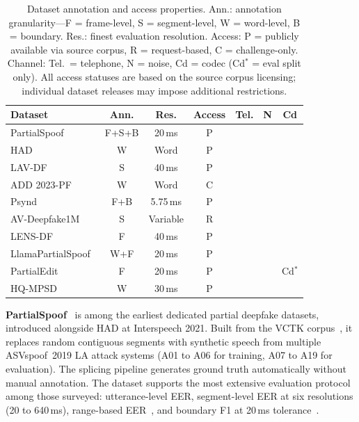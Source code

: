 \documentclass[journal]{IEEEtran}
\newcommand{\xmark}{\ding{55}}
\begin{document}
\begin{table}[t]
\centering
\caption{Dataset annotation and access properties. Ann.: annotation granularity---F = frame-level, S = segment-level, W = word-level, B = boundary. Res.: finest evaluation resolution. Access: P = publicly available via source corpus, R = request-based, C = challenge-only. Channel: Tel.\ = telephone, N = noise, Cd = codec (Cd$^*$ = eval split only). All access statuses are based on the source corpus licensing; individual dataset releases may impose additional restrictions.}
\label{tab:dataset_access}
\small
\begin{tabular}{lcccccc}
\toprule
\textbf{Dataset} & \textbf{Ann.} & \textbf{Res.} & \textbf{Access} & \textbf{Tel.} & \textbf{N} & \textbf{Cd} \\
\midrule
PartialSpoof~\cite{zhang2023partialspoof} & F+S+B & 20\,ms & P & \xmark & \xmark & \xmark \\
HAD~\cite{yi2021had}                      & W     & Word   & P & \xmark & \xmark & \xmark \\
LAV-DF~\cite{cai2022lavdf}               & S     & 40\,ms & P & \xmark & \xmark & \xmark \\
ADD 2023-PF~\cite{yi2023add}             & W     & Word   & C & \xmark & \xmark & \xmark \\
Psynd~\cite{zhang2022localizing}          & F+B   & 5.75\,ms & P & \xmark & \xmark & \xmark \\
AV-Deepfake1M~\cite{cai2024avdeepfake1m} & S     & Variable & R & \xmark & \xmark & \xmark \\
LENS-DF~\cite{liu2025lensdf}             & F     & 40\,ms & P & \xmark & \xmark & \xmark \\
LlamaPartialSpoof~\cite{luong2025llamapartialspoof} & W+F & 20\,ms & P & \xmark & \xmark & \xmark \\
PartialEdit~\cite{zhang2025partialedit}  & F     & 20\,ms & P & \xmark & \xmark & Cd$^*$ \\
HQ-MPSD~\cite{li2025hqmpsd}             & W     & 30\,ms & P & \xmark & \xmark & \xmark \\
\bottomrule
\end{tabular}
\end{table}

\textbf{PartialSpoof}~\cite{zhang2021initialinvestigation,zhang2023partialspoof} is among the earliest dedicated partial deepfake datasets, introduced alongside HAD at Interspeech 2021. Built from the VCTK corpus~\cite{veaux2016vctk}, it replaces random contiguous segments with synthetic speech from multiple ASVspoof~2019 LA attack systems (A01 to A06 for training, A07 to A19 for evaluation). The splicing pipeline generates ground truth automatically without manual annotation. The dataset supports the most extensive evaluation protocol among those surveyed: utterance-level EER, segment-level EER at six resolutions (20 to 640\,ms), range-based EER~\cite{zhang2023rangeeer}, and boundary F1 at 20\,ms tolerance~\cite{zhang2023partialspoof}.
\end{document}
